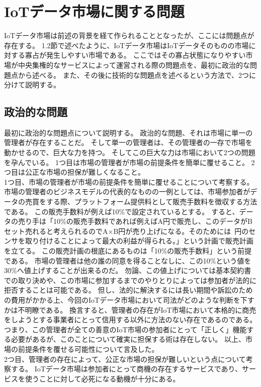 \section{IoTデータ市場に関する問題}
IoTデータ市場は前述の背景を経て作られることとなったが、ここには問題点が存在する。
1.2節で述べたように、IoTデータ市場はIoTデータそのものの市場に対する寡占が発生しやすい市場である。
ここではその寡占状態になりやすい市場が中央集権的なサービスによって運営される際の問題点を、最初に政治的な問題点から述べる。
また、その後に技術的な問題点を述べるという方法で、2つに分けて説明する。

\subsection{政治的な問題}
最初に政治的な問題点について説明する。
政治的な問題、それは市場に単一の管理者が存在することだ。
そして単一の管理者は、その管理者の一存で市場を動かせるので、巨大な力を持つ。
そしてこの巨大な力は市場において2つの問題を孕んでいる。
1つ目は市場の管理者が市場の前提条件を簡単に覆せること。
2つ目は公正な市場の担保が難しくなること。 \\
1つ目、市場の管理者が市場の前提条件を簡単に覆せることについて考察する。
市場の管理者のビジネスモデルの代表的なものの一例としては、市場参加者がデータの売買をする際、プラットフォーム提供料として販売手数料を徴収する方法である。
この販売手数料が例えば10\%で設定されているとする。
すると、データの売り手は「10\%の販売手数料であれば例えばA円で販売し、このデータがBセット売れると考えられるのでA×B円が売り上げになる。そのためには~円のセンサを取り付けることによって最大の利益が得られる。」という計画で販売計画を立てる。
この販売計画の根底にあるものは「10\%の販売手数料」という前提である。
市場の管理者は他の誰の同意を得ることなしに、この10\%という値を30\%へ値上げすることが出来るのだ。
勿論、この値上げについては基本契約書での取り決めや、この市場に参加するまでのやりとりによっては参加者が法的に拒否することは可能である。
但し、法的に解決するには長い期間や訴訟のための費用がかかる上、今回のIoTデータ市場において司法がどのような判断を下すかは不明瞭である。
換言すると、管理者の存在がIoT市場において本格的に商売をしようとする事業者にとって信用する以外に方法のない存在であるのである。
つまり、この管理者が全ての善意のIoT市場の参加者にとって「正しく」機能する必要があるが、このことについて確実に担保する術は存在しない。
以上、市場の前提条件を覆せる可能性について言及した。 \\
2つ目、管理者の存在によって、公正な市場の担保が難しいという点について考察する。
IoTデータ市場は参加者にとって商機の存在するサービスであり、サービスを使うことに対して必死になる動機が十分にある。
